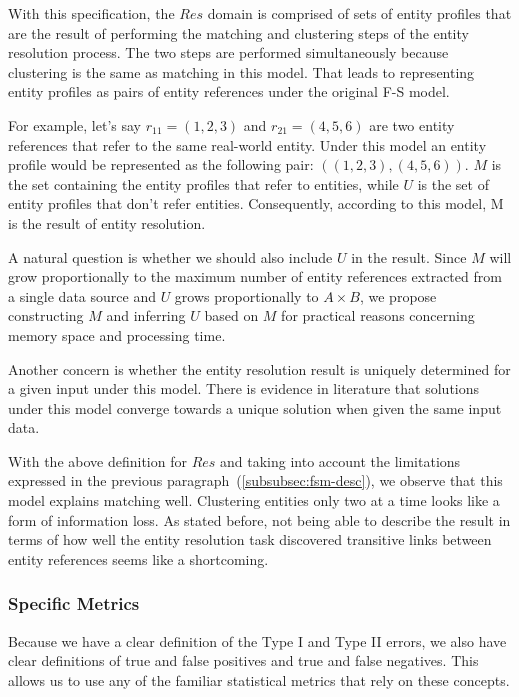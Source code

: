 With this specification, the $Res$ domain is comprised of sets of entity
profiles that are the result of performing the matching and clustering steps of
the entity resolution process.
The two steps are performed simultaneously because clustering is the same as
matching in this model.
That leads to representing entity profiles as pairs of entity references under
the original F-S model.

For example, let's say $r_{11}=(1, 2, 3)$ and $r_{21}=(4, 5, 6)$ are two entity
references that refer to the same real-world entity.
Under this model an entity profile would be represented as the following pair:
$((1, 2, 3), (4, 5, 6))$.
$M$ is the set containing the entity profiles that refer to entities, while
$U$ is the set of entity profiles that don't refer entities.
Consequently, according to this model, M is the result of entity resolution.

A natural question is whether we should also include $U$ in the result.
Since $M$ will grow proportionally to the maximum number of entity references
extracted from a single data source and $U$ grows proportionally to
$A \times B$, we propose constructing $M$ and inferring $U$ based on $M$ for
practical reasons concerning memory space and processing time.

Another concern is whether the entity resolution result is uniquely determined
for a given input under this model.
There is evidence in literature that solutions under this model converge towards
a unique solution when given the same input data\cite{winkler2014matching}.

With the above definition for $Res$ and taking into account the limitations
expressed in the previous paragraph~(\ref{subsubsec:fsm-desc}),
we observe that this model explains matching well.
Clustering entities only two at a time looks like a form of information loss.
As stated before, not being able to describe the result in terms of how well the
entity resolution task discovered transitive links between entity references
seems like a shortcoming.

\subsubsection[fsm-metrics]{Specific Metrics}\label{subsubsec:fsm-metrics}

Because we have a clear definition of the Type I and Type II errors, we also
have clear definitions of true and false positives and true and false negatives.
This allows us to use any of the familiar statistical metrics that rely on
these concepts.

